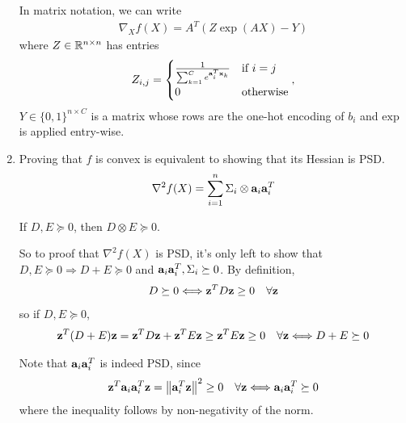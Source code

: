 \documentclass{article}
\begin{document}
\begin{enumerate}[label=1.I.\arabic*]
    In matrix notation, we can write
    \begin{align}
        \nabla_X f(X) = A^T (Z \exp{(A X)} - Y)
    \end{align}
    where $Z \in \R^{n \times n}$ has entries
    \begin{align*}
        Z_{i,j} = \begin{cases}
        \frac{1}{\sum_{k=1}^{C} e^{\aa_i^T \xx_{k}}} &\text{if }i=j \\
        0 &\text{otherwise}
        \end{cases},
    \end{align*}
    $Y\in \{0,1\}^{n\times C}$ is a matrix whose rows are the one-hot encoding of $b_i$ and $\text{exp}$ is applied entry-wise.
    \item Proving that $f$ is convex is equivalent to showing that its Hessian is PSD.
    \begin{align}
        \nabla^2 f(X) = \sum_{i=1}^{n} \Sigma_i \otimes \aa_i \aa_i^T
    \end{align}
    
    \begin{fact}
        If $D, E \succeq 0$, then $D \otimes E \succeq 0$.
        \label{fact1}
    \end{fact}
    
    So to proof that $ \nabla^2 f(X)$ is PSD, it's only left to show that $D,E \succeq 0 \Longrightarrow D+E \succeq 0$ and $\aa_i \aa_i^T, \Sigma_i \succeq 0$. By definition,
    \begin{align}
        D \succeq 0 \Longleftrightarrow \zz^T D \zz \geq 0 \quad \forall \zz
    \end{align}
    so if $D,E \succeq 0$,
    \begin{align}
        \zz^T (D + E) \zz = \zz^T D \zz + \zz^T E \zz \geq \zz^T E \zz \geq 0\quad \forall \zz \Longleftrightarrow D+E \succeq 0
        \label{eq:sum_psd}
    \end{align}

    Note that $\aa_i \aa_i^T$ is indeed PSD, since
    \begin{align}
        \zz^T \aa_i \aa_i^T \zz = \norm{\aa_i^T \zz}^2 \geq 0 \quad \forall \zz \Longleftrightarrow \aa_i \aa_i^T \succeq 0
    \end{align}
    where the inequality follows by non-negativity of the norm.
    

\end{enumerate}
\end{document}
